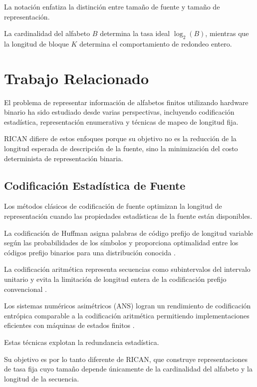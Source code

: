 \documentclass[onecolumn]{IEEEtran}
\begin{document}
La notación enfatiza la distinción entre tamaño de fuente y tamaño de
representación.

La cardinalidad del alfabeto $B$ determina la tasa ideal
$\log_2(B)$, mientras que la longitud de bloque $K$ determina el
comportamiento de redondeo entero.


\section{Trabajo Relacionado}

El problema de representar información de alfabetos finitos utilizando
hardware binario ha sido estudiado desde varias perspectivas,
incluyendo codificación estadística, representación enumerativa y
técnicas de mapeo de longitud fija.

RICAN difiere de estos enfoques porque su objetivo no es la reducción
de la longitud esperada de descripción de la fuente, sino la
minimización del costo determinista de representación binaria.

\subsection{Codificación Estadística de Fuente}

Los métodos clásicos de codificación de fuente optimizan la longitud
de representación cuando las propiedades estadísticas de la fuente
están disponibles.

La codificación de Huffman asigna palabras de código prefijo de
longitud variable según las probabilidades de los símbolos y
proporciona optimalidad entre los códigos prefijo binarios para una
distribución conocida \cite{huffman1952}.

La codificación aritmética representa secuencias como subintervalos del
intervalo unitario y evita la limitación de longitud entera de la
codificación prefijo convencional \cite{rissanen1979}.

Los sistemas numéricos asimétricos (ANS) logran un rendimiento de
codificación entrópica comparable a la codificación aritmética
permitiendo implementaciones eficientes con máquinas de estados finitos
\cite{duda2013}.

Estas técnicas explotan la redundancia estadística.

Su objetivo es por lo tanto diferente de RICAN, que construye
representaciones de tasa fija cuyo tamaño depende únicamente de la
cardinalidad del alfabeto y la longitud de la secuencia.
\end{document}
